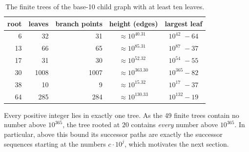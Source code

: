 \begin{table}[ht]
  \centering
  \begin{tabular}{@{}rrrcc@{}}
    \toprule
    root & leaves & branch points & height (edges)                   & largest leaf              \\
    \midrule
       6 &     32 &            31 & $\approx 10^{40.31\phantom{0}}$  & $10^{42\phantom{0}} - 64$ \\
      13 &     66 &            65 & $\approx 10^{85.31\phantom{0}}$  & $10^{87\phantom{0}} - 37$ \\
      17 &     31 &            30 & $\approx 10^{52.32\phantom{0}}$  & $10^{54\phantom{0}} - 55$ \\
      30 &   1008 &          1007 & $\approx 10^{363.30}$            & $10^{365}           - 82$ \\
      38 &     10 &             9 & $\approx 10^{15.32\phantom{0}}$  & $10^{17\phantom{0}} - 37$ \\
      64 &    285 &           284 & $\approx 10^{130.33}$            & $10^{132}           - 19$ \\
    \bottomrule
  \end{tabular}
  \caption{The finite trees of the base-10 child graph with at least ten leaves.}
  \label{tab:trees}
\end{table}

Every positive integer lies in exactly one tree. As the 49 finite trees contain no number above
$10^{365}$, the tree rooted at $20$ contains \emph{every} number above $10^{365}$. In particular,
above this bound its successor paths are exactly the successor sequences starting at the numbers
$c \cdot 10^j$, which motivates the next section.
